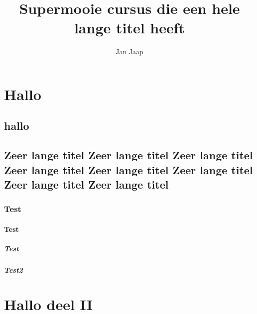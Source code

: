 \documentclass[11pt,dutch,faculty=we,layout=titlefont]{ugent2016-report}
\author{Jan Jaap}
\title{Supermooie cursus die een hele lange titel heeft}
\begin{document}
    \maketitle
    \tableofcontents

    \part{Hallo}
    \chapter{hallo}
    \lipsum
    \chapter{Zeer lange titel Zeer lange titel Zeer lange titel Zeer lange titel Zeer lange titel Zeer lange titel Zeer lange titel Zeer lange titel}
    \section{Test}
    \lipsum[3]
    \subsection{Test}
    \lipsum
    \subsubsection{Test}
    \lipsum
    \subsubsection{Test2}
    \lipsum[2]
    \part{Hallo deel II}
    \lipsum[5]
\end{document}
